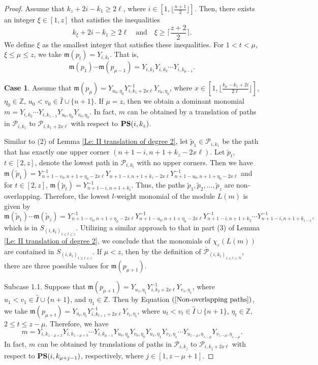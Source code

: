 \documentclass[12pt, reqno]{amsart}
\numberwithin{equation}{section}
\begin{document}
{\begin{proof}
Assume that $k_z+2i-k_1\geq 2 \ell$, where $i\in [1, \lfloor \frac{n+1}2 \rfloor]$. Then, there exists an integer $\xi\in[1,z]$ that satisfies the inequalities
\[
k_\xi+2i-k_1\geq 2 \ell \quad\text{and}\quad \xi \geq \lceil \frac{z+2}2 \rceil.
\]
We define $\xi$ as the smallest integer that satisfies these inequalities. For $1<t<\mu$, $\xi \leq \mu\leq z$, we take $\mathfrak{m}(p_t)=Y_{i,k_t}$. That is,
\[
\mathfrak{m}(p_1)\cdots \mathfrak{m}(p_{\mu-1})=Y_{i,k_1}Y_{i,k_2}\cdots Y_{i,k_{\mu-1}}.
\]

{\bf Case 1}. Assume that $\mathfrak{m}(p_{\mu})=Y_{u_0,\eta_0}Y_{i,k_1+2x \ell}^{-1}Y_{v_0,\eta_0}$, where $x\in[1,\lfloor\frac{k_\mu-k_1+2i}{2 \ell}\rfloor]$, $\eta_0\in \mathbb{Z}$, $u_0<v_0\in \hat{I} \cup \{n+1\}$. If $\mu=z$, then we obtain a dominant monomial $m=Y_{i,k_2}\cdots Y_{i,k_{z-1}}Y_{u_0,\eta_0}Y_{v_0,\eta_0}$. 
In fact, $m$ can be obtained by a translation of paths in $\mathscr{P}_{i,k_1}$ to $\mathscr{P}_{i,k_1+2x \ell}$ with respect to ${\bf PS}(i,k_z)$.

Similar to (2) of Lemma \ref{Le: II translation of degree 2}, let $\widetilde{p}_1\in \mathscr{P}_{i,k_1}$ be the path that has exactly one upper corner $(n+1-i,n+1+k_z-2x \ell)$. Let $\widetilde{p}_t$, $t\in[2, z]$, denote the lowest path in $\mathscr{P}_{i,k_t}$ with no upper corners. Then we have $\mathfrak{m}(\widetilde{p}_{1})=Y_{n+1-v_0,n+1+\eta_0-2x \ell}^{-1}Y_{n+1-i,n+1+k_z-2x \ell}Y_{n+1-u_0,n+1+\eta_0-2x \ell}^{-1}$ and for $t\in[2, z]$, $\mathfrak{m}(\widetilde{p}_{t})=Y_{n+1-i,n+1+k_t}^{-1}$. Thus, the paths $\widetilde{p}_{1}, \widetilde{p}_{2}, \ldots, \widetilde{p}_{z}$ are non-overlapping. Therefore, the lowest $l$-weight monomial of the module $L(m)$ is given by
\[
\mathfrak{m}(\widetilde{p}_{1})\cdots \mathfrak{m}(\widetilde{p}_{z})=
Y_{n+1-v_0,n+1+\eta_0-2x \ell}^{-1}Y_{n+1-u_0,n+1+\eta_0-2x \ell}^{-1}Y_{n+1-i,n+1+k_2}^{-1}\cdots Y_{n+1-i,n+1+k_{z-1}}^{-1},
\]
which is in $S_{(i,k_t)_{1 \leq t \leq z}}$. Utilizing a similar approach to that in part (3) of Lemma \ref{Le: II translation of degree 2}, we conclude that the monomials of $\chi_\varepsilon(L(m))$ are contained in $S_{(i,k_t)_{1 \leq t \leq z}}$. If $\mu<z$, then by the definition of $\overline{\mathscr{P}}_{(i,k_{t})_{1\leq t\leq N}}$, there are three possible values for $\mathfrak{m}(p_{\mu+1})$.



Subcase 1.1. Suppose that $\mathfrak{m}(p_{\mu+1})=Y_{u_1,\eta_1}Y_{i,k_2+2x\ell}^{-1}Y_{v_1,\eta_1}$, where $u_1<v_1 \in \hat{I} \cup \{n+1\}$, and $\eta_1\in \mathbb{Z}$. Then by Equation $(\ref{Non-overlapping paths})$, we take $\mathfrak{m}(p_{\mu+t})=Y_{u_t,\eta_t}Y_{i,k_{t+1}+2x\ell}^{-1}Y_{v_t,\eta_t}$, where $u_t<v_t \in \hat{I}\cup \{n+1\}$, $\eta_t\in \mathbb{Z}$, $2\leq t\leq z-\mu$. Therefore, we have
\[
m=Y_{i,k_{z-\mu+2}}Y_{i,k_{z-\mu+3}}\cdots Y_{i,k_{\mu-1}}Y_{u_0,\eta_0}Y_{v_0,\eta_0}Y_{u_1,\eta_1}Y_{v_1,\eta_1}\cdots Y_{u_{z-\mu},\eta_{z-\mu}}Y_{v_{z-\mu},\eta_{z-\mu}}.
\]
In fact, $m$ can be obtained by translations of paths in $\mathscr{P}_{i,k_j}$ to $\mathscr{P}_{i,k_j+2x \ell}$ with respect to ${\bf PS}(i,k_{\mu+j-1})$, respectively, where $j\in[1,z-\mu+1]$.


\end{proof}}
\end{document}
